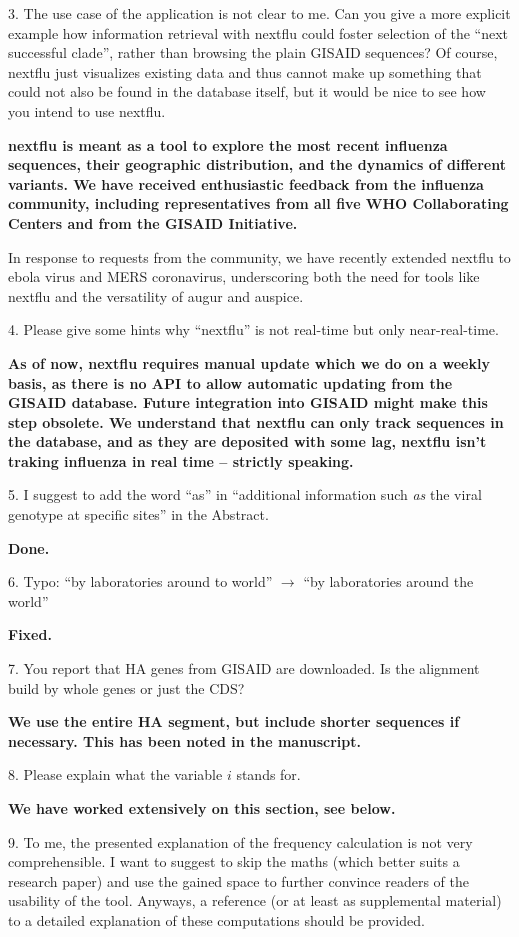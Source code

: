 \documentclass[11pt,oneside,letterpaper]{article}
\begin{document}
3. The use case of the application is not clear to me. Can you give a more explicit example how information retrieval with nextflu could foster selection of the ``next successful clade'', rather than browsing the plain GISAID sequences? Of course, nextflu just visualizes existing data and thus cannot make up something that could not also be found in the database itself, but it would be nice to see how you intend to use nextflu.

{\bf nextflu is meant as a tool to explore the most recent influenza sequences, their geographic distribution, and the dynamics of different variants. We have received enthusiastic feedback from the influenza community, including representatives from all five WHO Collaborating Centers and from the GISAID Initiative.

In response to requests from the community, we have recently extended nextflu to ebola virus and MERS coronavirus, underscoring both the need for tools like nextflu and the versatility of augur and auspice.}

4. Please give some hints why ``nextflu'' is not real-time but only near-real-time.

{\bf As of now, nextflu requires manual update which we do on a weekly basis, as there is no API to allow automatic updating from the GISAID database. Future integration into GISAID might make this step obsolete. We understand that nextflu can only track sequences in the database, and as they are deposited with some lag, nextflu isn't traking influenza in real time -- strictly speaking.}

5. I suggest to add the word ``as'' in ``additional information such \textit{as} the viral genotype at specific sites'' in the Abstract.

\textbf{Done.}

6. Typo: ``by laboratories around to world'' $\rightarrow$ ``by laboratories around the world''

\textbf{Fixed.}

7. You report that HA genes from GISAID are downloaded. Is the alignment build by whole genes or just the CDS?

{\bf We use the entire HA segment, but include shorter sequences if necessary. This has been noted in the manuscript.}

8. Please explain what the variable $i$ stands for.

{\bf We have worked extensively on this section, see below.}

9. To me, the presented explanation of the frequency calculation is not very comprehensible. I want to suggest to skip the maths (which better suits a research paper) and use the gained space to further convince readers of the usability of the tool. Anyways, a reference (or at least as supplemental material) to a detailed explanation of these computations should be provided.
\end{document}
